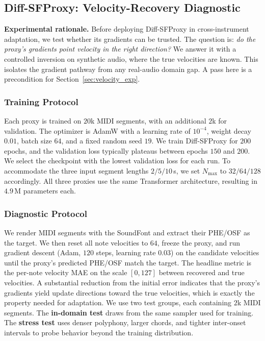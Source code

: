 \documentclass{article}
\begin{document}
\subsection{Diff-SFProxy: Velocity-Recovery Diagnostic}
\label{sec:proxy_exp}

\textbf{Experimental rationale.}
Before deploying Diff-SFProxy in cross-instrument adaptation, we test whether its gradients can be trusted. The question is: \emph{do the proxy's gradients point velocity in the right direction?} We answer it with a controlled inversion on synthetic audio, where the true velocities are known. This isolates the gradient pathway from any real-audio domain gap. A pass here is a precondition for Section~\ref{sec:velocity_exp}.

\subsubsection{Training Protocol}
Each proxy is trained on $20$k MIDI segments, with an additional $2$k for validation. The optimizer is AdamW with a learning rate of $10^{-4}$, weight decay $0.01$, batch size $64$, and a fixed random seed $19$. We train Diff-SFProxy for $200$ epochs, and the validation loss typically plateaus between epochs $150$ and $200$. We select the checkpoint with the lowest validation loss for each run. To accommodate the three input segment lengths $2/5/10$\,s, we set $N_{\max}$ to $32/64/128$ accordingly. All three proxies use the same Transformer architecture, resulting in $4.9$\,M parameters each.
 
\subsubsection{Diagnostic Protocol}
We render MIDI segments with the SoundFont and extract their PHE/OSF as the target. We then reset all note velocities to $64$, freeze the proxy, and run gradient descent (Adam, $120$ steps, learning rate $0.03$) on the candidate velocities until the proxy's predicted PHE/OSF match the target. The headline metric is the per-note velocity MAE on the scale $[0, 127]$ between recovered and true velocities. A substantial reduction from the initial error indicates that the proxy's gradients yield update directions toward the true velocities, which is exactly the property needed for adaptation. We use two test groups, each containing $2$k MIDI segments. The \textbf{in-domain test} draws from the same sampler used for training. The \textbf{stress test} uses denser polyphony, larger chords, and tighter inter-onset intervals to probe behavior beyond the training distribution.
\end{document}
